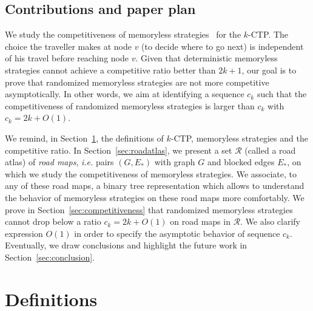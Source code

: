 \documentclass[11pt,letterpaper]{article}
\newcommand{\kctp}{$k$-CTP}
\begin{document}
\subsection{Contributions and paper plan}
We study the competitiveness of memoryless strategies~\cite{Al03,BoEl98} for the \kctp . The choice the traveller makes at node $v$ (to decide where to go next) is independent of his travel before reaching node $v$. 
Given that deterministic memoryless strategies cannot achieve a competitive ratio better than $2k+1$, our goal is to prove that randomized memoryless strategies are not more competitive asymptotically. In other words, we aim at identifying a sequence $c_k$ such that the competitiveness of randomized memoryless strategies is larger than $c_k$ with $c_k = 2k + O\left(1\right)$.

We remind, in Section~\ref{sec:def}, the definitions of \kctp , memoryless strategies and the competitive ratio.
In Section~\ref{sec:roadatlas}, we present a set $\mathcal{R}$ (called a road atlas) of \textit{road maps}, {\em i.e.} pairs $\left(G,E_*\right)$ with graph $G$ and blocked edges $E_*$, on which we study the competitiveness of memoryless strategies. We associate, to any of these road maps, a binary tree representation which allows to understand the behavior of memoryless strategies on these road maps more comfortably.
We prove in Section~\ref{sec:competitiveness} that randomized memoryless strategies cannot drop below a ratio $c_k = 2k+O\left(1\right)$ on road maps in $\mathcal{R}$. We also clarify expression $O\left(1\right)$ in order to specify the asymptotic behavior of sequence $c_k$.
Eventually, we draw conclusions and highlight the future work in Section~\ref{sec:conclusion}.
\section{Definitions} \label{sec:def}
\end{document}
